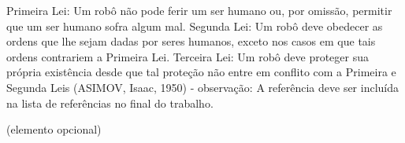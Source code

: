 \begin{epigrafe}
    Primeira Lei: Um robô não pode ferir um ser humano ou, por omissão, permitir que um ser humano sofra algum mal. Segunda Lei: Um robô deve obedecer as ordens que lhe sejam dadas por seres humanos, exceto nos casos em que tais ordens contrariem a Primeira Lei. Terceira Lei: Um robô deve proteger sua própria existência desde que tal proteção não entre em conflito com a Primeira e Segunda Leis (ASIMOV, Isaac, 1950) - observação: A referência deve ser incluída na lista de referências no final do trabalho.

    (elemento opcional)
\end{epigrafe}

